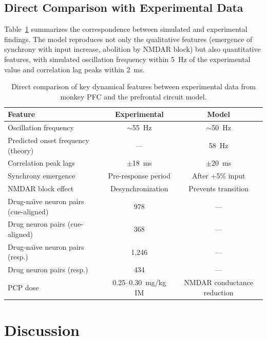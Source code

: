 \documentclass[10pt]{article}
\begin{document}
\subsection{Direct Comparison with Experimental Data}

Table~\ref{tab:comparison} summarizes the correspondence between simulated
and experimental findings. The model reproduces not only the qualitative
features (emergence of synchrony with input increase, abolition by NMDAR
block) but also quantitative features, with simulated oscillation frequency
within 5~Hz of the experimental value and correlation lag peaks within 2~ms.

\begin{table}[htbp]
\centering
\caption{Direct comparison of key dynamical features between experimental
data from monkey PFC \citep{zick2018blocking} and the prefrontal circuit
model.}
\label{tab:comparison}
\begin{tabular}{lcc}
\toprule
Feature & Experimental & Model \\
\midrule
Oscillation frequency & $\sim$55~Hz & $\sim$50~Hz \\
Predicted onset frequency (theory) & --- & 58~Hz \\
Correlation peak lags & $\pm$18~ms & $\pm$20~ms \\
Synchrony emergence & Pre-response period & After +5\% input \\
NMDAR block effect & Desynchronization & Prevents transition \\
Drug-na\"{\i}ve neuron pairs (cue-aligned) & 978 & --- \\
Drug neuron pairs (cue-aligned) & 368 & --- \\
Drug-na\"{\i}ve neuron pairs (resp.) & 1{,}246 & --- \\
Drug neuron pairs (resp.) & 434 & --- \\
PCP dose & 0.25--0.30~mg/kg IM & NMDAR conductance reduction \\
\bottomrule
\end{tabular}
\end{table}

\section{Discussion}
\end{document}
